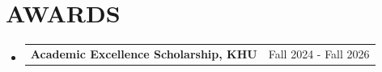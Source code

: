 \documentclass[11pt,a4paper]{article}
\makeatletter
\let\cvOriginalNormalSize\normalsize
\renewcommand{\normalsize}{\cvOriginalNormalSize\fontsize{11bp}{13bp}\selectfont}
\let\cvOriginalSmall\small
\renewcommand{\small}{\cvOriginalSmall\fontsize{10bp}{13bp}\selectfont}
\newcommand{\resumeHeading}[2]{
  \item[] \leavevmode \normalsize
  \begin{tabular*}{\linewidth}{@{}l@{\extracolsep{\fill}}r@{}}
    \textbf{#1} & #2 \\
  \end{tabular*}\vspace{-5pt}
}
\newcommand{\resumeCourse}[1]{
  \item[] \leavevmode \small
  \begin{tabular*}{\linewidth}{@{}l@{}}
    {#1} \\
  \end{tabular*}\vspace{-5pt}
}
\makeatother
\begin{document}
\section{AWARDS}
\begin{itemize}
    \resumeHeading{Academic Excellence Scholarship, \textnormal{KHU}}{Fall 2024 - Fall 2026}
\end{itemize}

\end{document}
